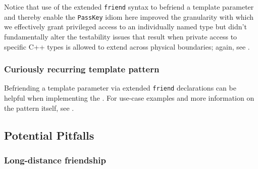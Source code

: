 \noindent Notice that use of the extended \lstinline!friend! syntax to befriend a
template parameter and thereby enable the \lstinline!PassKey! idiom here
improved the granularity with which we effectively grant privileged
access to an individually named type but didn't fundamentally alter the
testability issues that result when private access to specific C++
types is allowed to extend across physical boundaries; again, see .

\subsubsection[Curiously recurring template pattern]{Curiously recurring template pattern}\label{curiously-recurring-template-pattern}

Befriending a template parameter via extended \lstinline!friend!
declarations can be helpful when implementing the . For use-case examples and more
information on the pattern itself, see .

\subsection[Potential Pitfalls]{Potential Pitfalls}\label{potential-pitfalls-extendedfriend}

\subsubsection[Long-distance friendship]{Long-distance friendship}\label{long-distance-friendship}

